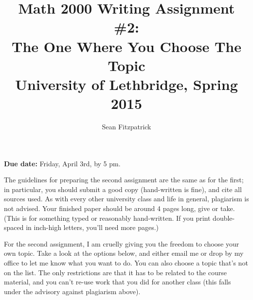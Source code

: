 \documentclass[letterpaper,12pt]{article}
\title{Math 2000 Writing Assignment \#2:\\ The One Where You Choose The Topic\\University of Lethbridge, Spring 2015}
\author{Sean Fitzpatrick}
\begin{document}
 \maketitle

{\bf Due date:} Friday, April 3rd, by 5 pm.

\bigskip

The guidelines for preparing the second assignment are the same as for the first; in particular, you should submit a good copy (hand-written is fine), and cite all sources used. As with every other university class and life in general, plagiarism is not advised. Your finished paper should be around 4 pages long, give or take. (This is for something typed or reasonably hand-written. If you print double-spaced in inch-high letters, you'll need more pages.)

For the second assignment, I am cruelly giving you the freedom to choose your own topic. Take a look at the options below, and either email me or drop by my office to let me know what you want to do. You can also choose a topic that's not on the list. The only restrictions are that it has to be related to the course material, and you can't re-use work that you did for another class (this falls under the advisory against plagiarism above).

\bigskip
\end{document}
